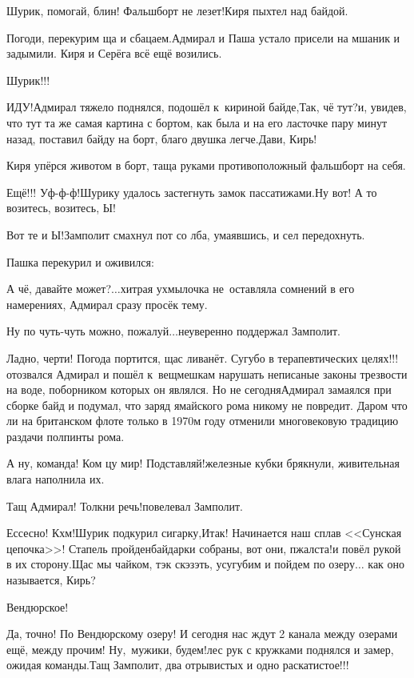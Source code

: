 \diagdash Шурик, помогай, блин! Фальшборт не лезет!\mdash Киря пыхтел над байдой.

\diagdash Погоди, перекурим ща и сбацаем.\mdash Адмирал и Паша устало присели на мшаник и задымили. Киря и Серёга всё ещё возились. 

\diagdash Шурик!!!

\diagdash ИДУ!\mdash Адмирал тяжело поднялся, подошёл к~кириной байде,\mdash Так, чё тут?\mdash и, увидев, что тут та же самая картина с бортом, как была и на его ласточке пару минут назад, поставил байду на борт, благо двушка легче.\mdash Дави, Кирь!

Киря упёрся животом в борт, таща руками противоположный фальшборт на себя.

\diagdash Ещё!!! Уф-ф-ф!\mdash Шурику удалось застегнуть замок пассатижами.\mdash Ну вот! А то возитесь, возитесь, Ы!

\diagdash Вот те и Ы!\mdash Замполит смахнул пот со лба, умаявшись, и сел передохнуть.

Пашка перекурил и оживился:

\diagdash А чё, давайте может?$\ldots$\mdash хитрая ухмылочка не~оставляла сомнений в его намерениях, Адмирал сразу просёк тему.

\diagdash Ну по чуть-чуть можно, пожалуй$\ldots$\mdash неуверенно поддержал Замполит.

\diagdash Ладно, черти! Погода портится, щас ливанёт. Сугубо в терапевтических целях!!!\mdash отозвался Адмирал и пошёл к~вещмешкам нарушать неписаные законы трезвости на воде, поборником которых он являлся. Но не сегодня\mdash Адмирал замаялся при сборке байд и подумал, что заряд ямайского рома никому не повредит. Даром что ли на британском флоте только в 1970\sdash м году отменили многовековую традицию раздачи полпинты рома.

\diagdash А ну, команда! Ком цу мир! Подставляй!\mdash железные кубки брякнули, живительная влага наполнила их.

\diagdash Тащ Адмирал! Толкни речь!\mdash повелевал Замполит.

\diagdash Ессесно! Кхм!\mdash Шурик подкурил сигарку,\mdash Итак! Начинается наш сплав <<Сунская цепочка>>! Стапель пройден\mdash байдарки собраны, вот они, пжалста!\mdash и повёл рукой в их сторону.\mdash Щас мы чайком, тэк скэзэть, усугубим и пойдем по озеру$\ldots$ как оно называется, Кирь?

\diagdash Вендюрское! 

\diagdash Да, точно! По Вендюрскому озеру! И сегодня нас ждут 2 канала между озерами ещё, между прочим! Ну,~мужики, будем!\mdash лес рук с кружками поднялся и замер, ожидая команды.\mdash Тащ Замполит, два отрывистых и одно раскатистое!!!

